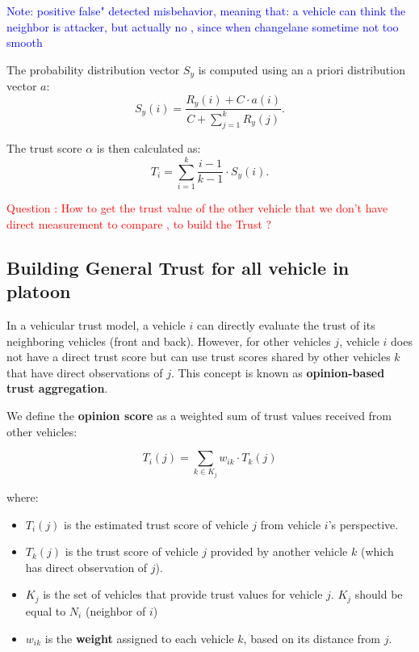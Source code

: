 \documentclass[letterpaper, 10pt, conference]{ieeeconf}  %
\begin{document}
\textcolor{blue}{Note: positive false" detected misbehavior, meaning that: a vehicle can think the neighbor is attacker, but actually no , since when changelane sometime not too smooth}


The probability distribution vector $S_y$ is computed using an a priori distribution vector $a$:
\begin{equation}
    S_y(i) = \frac{R_y(i) + C \cdot a(i)}{C + \sum_{j=1}^k R_y(j)}.
\end{equation}

The trust score $\alpha$ is then calculated as:
\begin{equation}
    T_i = \sum_{i=1}^k \frac{i-1}{k-1} \cdot S_y(i).
\end{equation}

\textcolor{red}{Question : How to get the trust value of the other vehicle that we don't have direct measurement to compare , to build the Trust ?} 
\subsection{Building General Trust  for all vehicle in platoon}

In a vehicular trust model, a vehicle \( i \) can directly evaluate the trust of its neighboring vehicles (front and back). However, for other vehicles \( j \), vehicle \( i \) does not have a direct trust score but can use trust scores shared by other vehicles \( k \) that have direct observations of \( j \). This concept is known as \textbf{opinion-based trust aggregation}.

We define the \textbf{opinion score} as a weighted sum of trust values received from other vehicles:

\[
T_i(j) = \sum_{k \in K_j} w_{ik} \cdot T_k(j)
\]

where:
\begin{itemize}
    \item \( T_i(j) \) is the estimated trust score of vehicle \( j \) from vehicle \( i \)'s perspective.
    \item \( T_k(j) \) is the trust score of vehicle \( j \) provided by another vehicle \( k \) (which has direct observation of \( j \)).
    \item \( K_j \) is the set of vehicles that provide trust values for vehicle \( j \). $K_j$ should be equal to $N_i$ (neighbor of $i$)
    \item \( w_{ik} \) is the \textbf{weight} assigned to each vehicle \( k \), based on its distance from \( j \).
\end{itemize}
\end{document}
